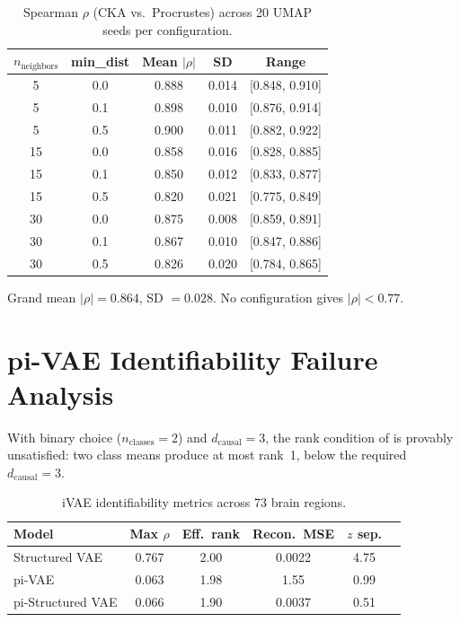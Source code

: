 \documentclass{article}
\begin{document}
\begin{table}[h]
\centering
\small
\caption{Spearman $\rho$ (CKA vs.\ Procrustes) across 20 UMAP seeds per configuration.}
\label{tab:umap}
\begin{tabular}{@{}ccccc@{}}
\toprule
\textbf{$n_{\text{neighbors}}$} & \textbf{min\_dist} & \textbf{Mean $|\rho|$} & \textbf{SD} & \textbf{Range} \\
\midrule
5 & 0.0 & 0.888 & 0.014 & [0.848, 0.910] \\
5 & 0.1 & 0.898 & 0.010 & [0.876, 0.914] \\
5 & 0.5 & 0.900 & 0.011 & [0.882, 0.922] \\
15 & 0.0 & 0.858 & 0.016 & [0.828, 0.885] \\
15 & 0.1 & 0.850 & 0.012 & [0.833, 0.877] \\
15 & 0.5 & 0.820 & 0.021 & [0.775, 0.849] \\
30 & 0.0 & 0.875 & 0.008 & [0.859, 0.891] \\
30 & 0.1 & 0.867 & 0.010 & [0.847, 0.886] \\
30 & 0.5 & 0.826 & 0.020 & [0.784, 0.865] \\
\bottomrule
\end{tabular}
\end{table}

Grand mean $|\rho| = 0.864$, SD $= 0.028$. No configuration gives $|\rho| < 0.77$.


\section{pi-VAE Identifiability Failure Analysis}
\label{app:ivae-verification}

With binary choice ($n_{\text{classes}} = 2$) and $d_{\text{causal}} = 3$, the rank condition of \citet{khemakhem2020variational} is provably unsatisfied: two class means produce at most rank~1, below the required $d_{\text{causal}} = 3$.

\begin{table}[h]
\centering
\caption{iVAE identifiability metrics across 73 brain regions.}
\label{tab:ivae-verification}
\small
\begin{tabular}{lccccc}
\toprule
\textbf{Model} & \textbf{Max $\rho$} & \textbf{Eff.\ rank} & \textbf{Recon.\ MSE} & \textbf{$z$ sep.} \\
\midrule
Structured VAE       & 0.767 & 2.00 & 0.0022  & 4.75 \\
pi-VAE               & 0.063 & 1.98 & 1.55    & 0.99 \\
pi-Structured VAE    & 0.066 & 1.90 & 0.0037  & 0.51 \\
\bottomrule
\end{tabular}
\end{table}
\end{document}
